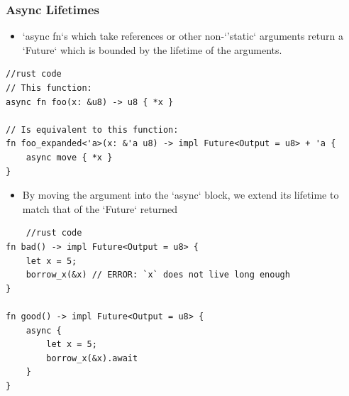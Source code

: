 \begin{frame}[fragile]
    \frametitle{Async Lifetimes}
% 
% 
    \begin{itemize}
        \item `async fn`s which take references or other non-`'static` arguments return a `Future` which is bounded by the lifetime of the arguments.
    \end{itemize}
% 
\begin{block}{}
    \begin{verbatim}
//rust code
// This function:
async fn foo(x: &u8) -> u8 { *x }

// Is equivalent to this function:
fn foo_expanded<'a>(x: &'a u8) -> impl Future<Output = u8> + 'a {
    async move { *x }
}
    \end{verbatim}
\end{block}
% 
    \begin{itemize}
        \item By moving the argument into the `async` block, we extend its lifetime to match that of the `Future` returned
    \end{itemize}
% 
\begin{block}{}
    \begin{verbatim}
    //rust code
fn bad() -> impl Future<Output = u8> {
    let x = 5;
    borrow_x(&x) // ERROR: `x` does not live long enough
}

fn good() -> impl Future<Output = u8> {
    async {
        let x = 5;
        borrow_x(&x).await
    }
}
    \end{verbatim}
\end{block}
% 
\end{frame}
